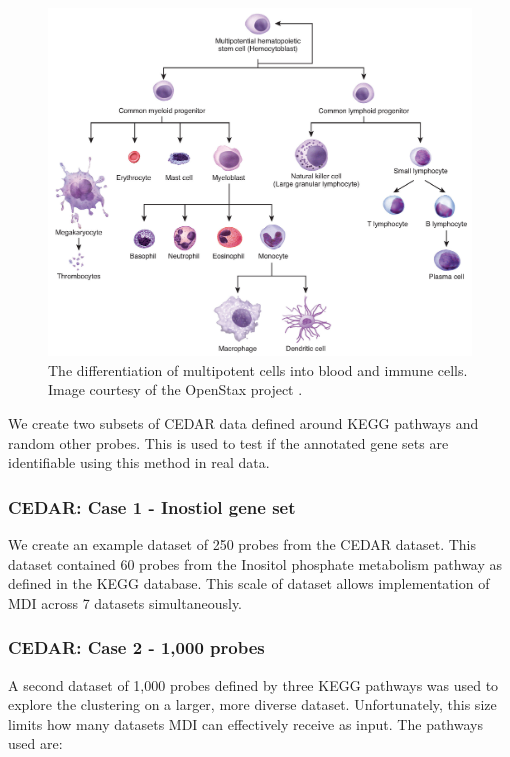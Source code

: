 \documentclass[12pt]{article} %
\begin{document}
	\begin{figure}[h]
		\centering
		\includegraphics[scale=0.75]{Images/white_blood_cell_differentiation.jpg}
		\caption{The differentiation of multipotent cells into blood and immune cells. Image courtesy of the OpenStax project \cite{OpenStaxAnatomyPhysiology2016}.}
		\label{fig:white_blood_cell_differentiation}
	\end{figure}

	 We create two subsets of CEDAR data defined around KEGG pathways and random other probes. This is used to test if the annotated gene sets are identifiable using this method in real data.
	 

	 

	\subsubsection{CEDAR: Case 1 - Inostiol gene set}

	We create an example dataset of 250 probes from the CEDAR dataset. This dataset contained 60 probes from the Inositol phosphate metabolism pathway as defined in the KEGG database. This scale of dataset allows implementation of MDI across 7 datasets simultaneously.
	
	\subsubsection{CEDAR: Case 2 - 1,000 probes}
	
	A second dataset of 1,000 probes defined by three KEGG pathways was used to explore the clustering on a larger, more diverse dataset. Unfortunately, this size limits how many datasets MDI can effectively receive as input. The pathways used are:
	
\end{document}
